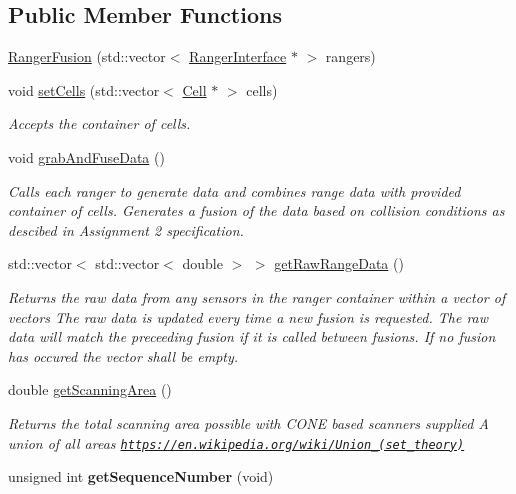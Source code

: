 \subsection*{Public Member Functions}
\begin{DoxyCompactItemize}
\item 
\hyperlink{classRangerFusion_a977f1817c88c33e8f35695a530e44a9c}{Ranger\+Fusion} (std\+::vector$<$ \hyperlink{classRangerInterface}{Ranger\+Interface} $\ast$ $>$ rangers)
\item 
void \hyperlink{classRangerFusion_ae3128f8cc8f4cb955d8db661aefba3dc}{set\+Cells} (std\+::vector$<$ \hyperlink{classCell}{Cell} $\ast$ $>$ cells)
\begin{DoxyCompactList}\small\item\em Accepts the container of cells. \end{DoxyCompactList}\item 
void \hyperlink{classRangerFusion_aa9265f72bc3572567c9cf98cf6d9f0e1}{grab\+And\+Fuse\+Data} ()\hypertarget{classRangerFusion_aa9265f72bc3572567c9cf98cf6d9f0e1}{}\label{classRangerFusion_aa9265f72bc3572567c9cf98cf6d9f0e1}

\begin{DoxyCompactList}\small\item\em Calls each ranger to generate data and combines range data with provided container of cells. Generates a \textquotesingle{}fusion\textquotesingle{} of the data based on collision conditions as descibed in Assignment 2 specification. \end{DoxyCompactList}\item 
std\+::vector$<$ std\+::vector$<$ double $>$ $>$ \hyperlink{classRangerFusion_a5780383fdffe121a7a2372a047819ba9}{get\+Raw\+Range\+Data} ()
\begin{DoxyCompactList}\small\item\em Returns the raw data from any sensors in the ranger container within a vector of vectors The raw data is updated every time a new fusion is requested. The raw data will match the preceeding fusion if it is called between fusions. If no fusion has occured the vector shall be empty. \end{DoxyCompactList}\item 
double \hyperlink{classRangerFusion_a7215e5405e808b5a853984e2b70ed6ad}{get\+Scanning\+Area} ()
\begin{DoxyCompactList}\small\item\em Returns the total scanning area possible with C\+O\+NE based scanners supplied A union of all areas \href{https://en.wikipedia.org/wiki/Union_(set_theory)}{\tt https\+://en.\+wikipedia.\+org/wiki/\+Union\+\_\+(set\+\_\+theory)} \end{DoxyCompactList}\item 
unsigned int {\bfseries get\+Sequence\+Number} (void)\hypertarget{classRangerFusion_ad5f1752d3f1ddf1d4250c7e434971f1c}{}\label{classRangerFusion_ad5f1752d3f1ddf1d4250c7e434971f1c}

\end{DoxyCompactItemize}


